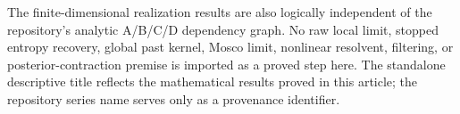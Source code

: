 The finite-dimensional realization results are also logically independent of the repository's analytic A/B/C/D dependency graph. No raw local limit, stopped entropy recovery, global past kernel, Mosco limit, nonlinear resolvent, filtering, or posterior-contraction premise is imported as a proved step here. The standalone descriptive title reflects the mathematical results proved in this article; the repository series name serves only as a provenance identifier.
